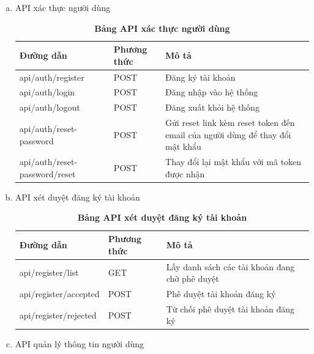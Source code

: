 \begin{enumerate}[a)]
  \item API xác thực người dùng

  \begin{xltabular}{\textwidth}{
    | >{\raggedright\arraybackslash}p{4.5cm}
    | >{\centering\arraybackslash}m{2.8cm}
    | >{\raggedright\arraybackslash}X |
    }
    \caption{\bfseries \fontsize{12pt}{0pt}\selectfont Bảng API xác thực người dùng}
    \label{table_api_auth}
    \\
    \hline
    \bfseries Đường dẫn    &\bfseries Phương thức    &\bfseries Mô tả\\ \hline
    api/auth/register   &   POST  & Đăng ký tài khoản \\ \hline
  api/auth/login   &    POST    & Đăng nhập vào hệ thống \\ \hline
  api/auth/logout   &    POST    & Đăng xuất khỏi hệ thống \\ \hline
  api/auth/reset-password  &     POST   &  Gửi reset link kèm reset token đến email của người dùng để thay đổi mật khẩu \\  \hline
  api/auth/reset-password/reset &   POST     &  Thay đổi lại mật khẩu với mã token được nhận  \\ \hline
  \end{xltabular}

  \item API xét duyệt đăng ký tài khoản

  \begin{xltabular}{\textwidth}{
    | >{\raggedright\arraybackslash}p{4cm}
    | >{\centering\arraybackslash}m{2.8cm}
    | >{\raggedright\arraybackslash}X |
    }
    \caption{\bfseries \fontsize{12pt}{0pt}\selectfont Bảng API xét duyệt đăng ký tài khoản}
    \label{table_api_register}
    \\
    \hline
    \bfseries Đường dẫn    &\bfseries Phương thức    &\bfseries Mô tả\\ \hline
    api/register/list   &   GET  & Lấy danh sách các tài khoản đang chờ phê duyệt \\ \hline
    api/register/accepted   &    POST    & Phê duyệt tài khoản đăng ký \\ \hline
    api/register/rejected  &     POST   &  Từ chối phê duyệt tài khoản đăng ký \\  \hline  
  \end{xltabular}

  \item API quản lý thông tin người dùng
  

\end{enumerate}

